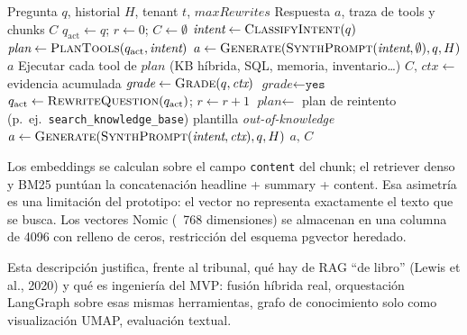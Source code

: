 \begin{algorithm}[htbp]
\caption{Respuesta Agentic RAG (LangGraph)}
\label{alg:rag-agentic}
\begin{algorithmic}[1]
\Require Pregunta $q$, historial $H$, tenant $t$, $\textit{maxRewrites}$
\Ensure Respuesta $a$, traza de tools y chunks $C$
\State $q_{\mathrm{act}} \gets q$;\; $r \gets 0$;\; $C \gets \emptyset$
\State $\textit{intent} \gets \textsc{ClassifyIntent}(q)$
\State $\textit{plan} \gets \textsc{PlanTools}(q_{\mathrm{act}}, \textit{intent})$ 
  \State $a \gets \textsc{Generate}(\textsc{SynthPrompt}(\textit{intent}, \emptyset), q, H)$
  \State \Return $a$ 
\EndIf
\Repeat
  \State Ejecutar cada tool de $\textit{plan}$ (KB híbrida, SQL, memoria, inventario\ldots)
  \State $C,\,\textit{ctx} \gets$ evidencia acumulada
    \State $\textit{grade} \gets \textsc{Grade}(q, \textit{ctx})$ 
  \Else
    \State $\textit{grade} \gets \texttt{yes}$
  \EndIf
    \State $q_{\mathrm{act}} \gets \textsc{RewriteQuestion}(q_{\mathrm{act}})$;\; $r \gets r+1$
    \State $\textit{plan} \gets$ plan de reintento (p.\ ej.\ \texttt{search\_knowledge\_base})
  \EndIf
{}
  \State \Return plantilla \emph{out-of-knowledge}
\EndIf
\State $a \gets \textsc{Generate}(\textsc{SynthPrompt}(\textit{intent}, \textit{ctx}), q, H)$
\State \Return $a,\,C$
\end{algorithmic}
\end{algorithm}

Los embeddings se calculan sobre el campo \texttt{content} del chunk; el retriever denso y BM25 puntúan la concatenación headline + summary + content. Esa asimetría es una limitación del prototipo: el vector no representa exactamente el texto que se busca. Los vectores Nomic (~768 dimensiones) se almacenan en una columna de 4096 con relleno de ceros, restricción del esquema pgvector heredado.

Esta descripción justifica, frente al tribunal, qué hay de RAG ``de libro'' (Lewis et al., 2020) y qué es ingeniería del MVP: fusión híbrida real, orquestación LangGraph sobre esas mismas herramientas, grafo de conocimiento solo como visualización UMAP, evaluación textual.

